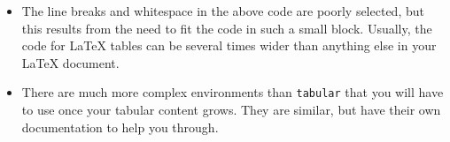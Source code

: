 \begin{itemize}
{\begin{minipage}{\linewidth}
\begin{verbatim}
  \begin{center}
    \begin{tabular}{c c c} 
      \hline 
      \hline
      Student & Alma Mater & Favorite Color \\
      \hline
      Tyson Chatagnier & Texas A\&M & Denim \\
      Jonathan Klingler & Notre Dame & Green \\
      Gary Hollibaugh & UCSD & Orange and Aquamarine \\
      Jonathan Olmsted & UDel & French Blue \\
      Peter Haschke & UNC-Asheville & Titian Red \\
      Lukas Pfaff & Iowa State University & Cornflower blue
      \footnote{This is not necessarily true, it is, 
        however, just a corn joke!'}\\
      \hline
      \hline
    \end{tabular}
  \end{center}

\end{verbatim}
    \end{minipage}
  }

\item The line breaks and whitespace in the above code are poorly
  selected, but this results from the need to fit the code in such a
  small block. Usually, the code for \LaTeX{} tables can be several
  times wider than anything else in your \LaTeX{} document.

\item There are much more complex environments than 
  \texttt{tabular} that you will have to use once your 
  tabular content grows. They are similar, but have 
  their own documentation to help you through. 
  \end{itemize}
  
